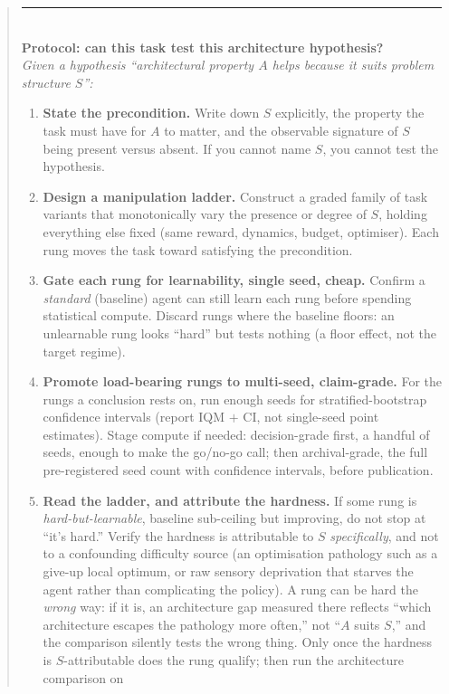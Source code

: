 \documentclass[10pt]{article}
\begin{document}
\begin{quote}
\rule{\linewidth}{0.6pt}\\[0.4em]
\textbf{Protocol: can this task test this architecture hypothesis?}\\[0.2em]
\emph{Given a hypothesis ``architectural property $A$ helps because it suits problem
structure $S$'':}
\begin{enumerate}
\item \textbf{State the precondition.} Write down $S$ explicitly, the property the task must
   have for $A$ to matter, and the observable signature of $S$ being present versus absent.
   If you cannot name $S$, you cannot test the hypothesis.
\item \textbf{Design a manipulation ladder.} Construct a graded family of task variants that
   monotonically vary the presence or degree of $S$, holding everything else fixed (same
   reward, dynamics, budget, optimiser). Each rung moves the task toward satisfying the
   precondition.
\item \textbf{Gate each rung for learnability, single seed, cheap.} Confirm a \emph{standard}
   (baseline) agent can still learn each rung before spending statistical compute. Discard
   rungs where the baseline floors: an unlearnable rung looks ``hard'' but tests nothing (a
   floor effect, not the target regime).
\item \textbf{Promote load-bearing rungs to multi-seed, claim-grade.} For the rungs a
   conclusion rests on, run enough seeds for stratified-bootstrap confidence intervals
   (report IQM $+$ CI, not single-seed point estimates). Stage compute if needed:
   decision-grade first, a handful of seeds, enough to make the go/no-go call; then
   archival-grade, the full pre-registered seed count with confidence intervals, before
   publication.
\item \textbf{Read the ladder, and attribute the hardness.} If some rung is
   \emph{hard-but-learnable}, baseline sub-ceiling but improving, do not stop at ``it's
   hard.'' Verify the hardness is attributable to $S$ \emph{specifically}, and not to a
   confounding difficulty source (an optimisation pathology such as a give-up local optimum,
   or raw sensory deprivation that starves the agent rather than complicating the policy). A
   rung can be hard the \emph{wrong} way: if it is, an architecture gap measured there
   reflects ``which architecture escapes the pathology more often,'' not ``$A$ suits $S$,''
   and the comparison silently tests the wrong thing. Only once the hardness is
   $S$-attributable does the rung qualify; then run the architecture comparison on

\end{enumerate}
\end{quote}
\end{document}
